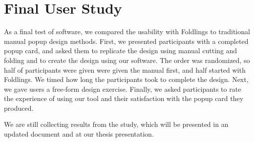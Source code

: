 \section{Final User Study}\label{final-user-study}

As a final test of software, we compared the usability with Foldlings to
traditional manual popup design methods. First, we presented
participants with a completed popup card, and asked them to replicate
the design using manual cutting and folding and to create the design
using our software. The order was randomized, so half of participants
were given were given the manual first, and half started with Foldlings.
We timed how long the participants took to complete the design. Next, we
gave users a free-form design exercise. Finally, we asked participants
to rate the experience of using our tool and their satisfaction with the
popup card they produced.

We are still collecting results from the study, which will be presented
in an updated document and at our thesis presentation.
